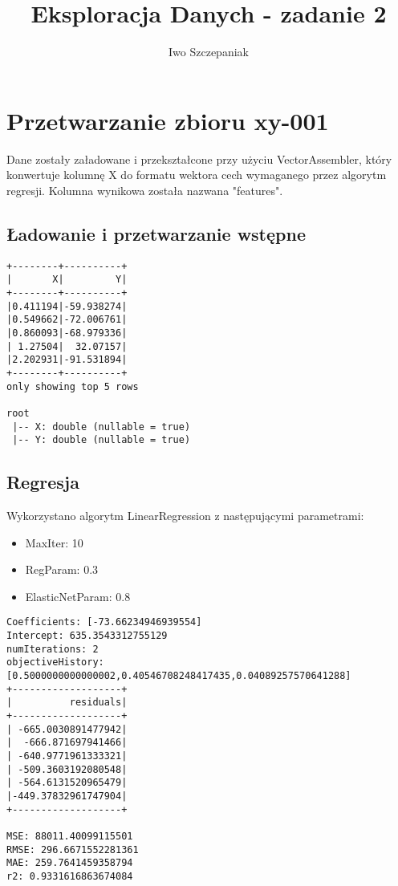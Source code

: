 \documentclass{article}
\title{Eksploracja Danych - zadanie 2}
\author{Iwo Szczepaniak}
\begin{document}
\maketitle

\section{Przetwarzanie zbioru xy-001}
Dane zostały załadowane i przekształcone przy użyciu VectorAssembler, który konwertuje kolumnę X do formatu wektora cech wymaganego przez algorytm regresji. Kolumna wynikowa została nazwana "features".

\subsection{Ładowanie i przetwarzanie wstępne}
\begin{verbatim}
+--------+----------+
|       X|         Y|
+--------+----------+
|0.411194|-59.938274|
|0.549662|-72.006761|
|0.860093|-68.979336|
| 1.27504|  32.07157|
|2.202931|-91.531894|
+--------+----------+
only showing top 5 rows

root
 |-- X: double (nullable = true)
 |-- Y: double (nullable = true)
\end{verbatim}

\subsection{Regresja}
Wykorzystano algorytm LinearRegression z następującymi parametrami:
\begin{itemize}
    \item MaxIter: 10
    \item RegParam: 0.3
    \item ElasticNetParam: 0.8
\end{itemize}

\begin{verbatim}
Coefficients: [-73.66234946939554]
Intercept: 635.3543312755129
numIterations: 2
objectiveHistory: [0.5000000000000002,0.40546708248417435,0.04089257570641288]
+-------------------+
|          residuals|
+-------------------+
| -665.0030891477942|
|  -666.871697941466|
| -640.9771961333321|
| -509.3603192080548|
| -564.6131520965479|
|-449.37832961747904|
+-------------------+

MSE: 88011.40099115501
RMSE: 296.6671552281361
MAE: 259.7641459358794
r2: 0.9331616863674084
\end{verbatim}
\end{document}
